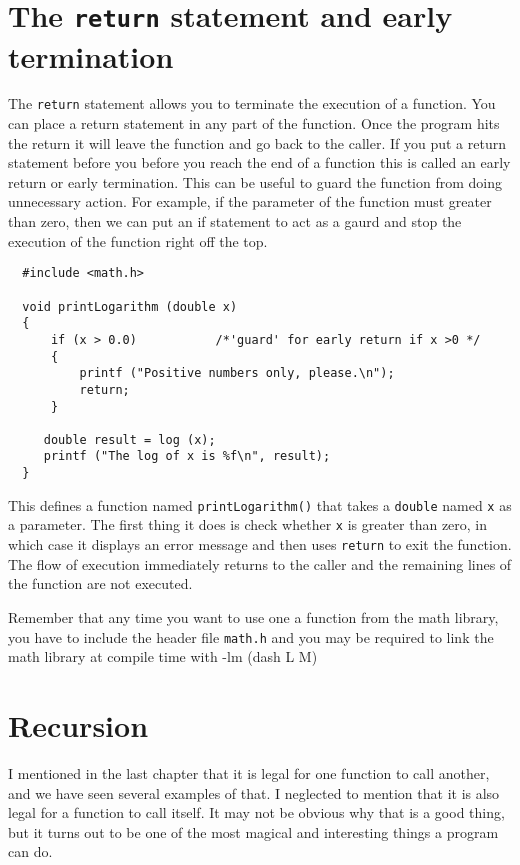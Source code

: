 \section{The {\tt return} statement and early termination}

The {\tt return} statement allows you to terminate the execution
of a function. You can place a return statement in any part of the function. Once the program hits the return it will leave the function and go back to the caller. 
If you put a return statement before you before you reach the end of a function this is called an early return or early termination. This can be useful to guard the function from doing unnecessary action. For example, if the parameter of the function must greater than zero, then we can put an if statement to act as a gaurd and stop the 
execution of the function right off the top.

\begin{verbatim}
  #include <math.h>

  void printLogarithm (double x) 
  {
      if (x > 0.0) 			 /*'guard' for early return if x >0 */
      {
          printf ("Positive numbers only, please.\n");
          return;  
      }

     double result = log (x);
     printf ("The log of x is %f\n", result);
  }
\end{verbatim}
%
This defines a function named {\tt printLogarithm()} that takes
a {\tt double} named {\tt x} as a parameter.  The first thing
it does is check whether {\tt x} is greater than
zero, in which case it displays an error message and then uses
{\tt return} to exit the function.  The flow of execution
immediately returns to the caller and the remaining lines of
the function are not executed.

Remember that any time you want to use one a function from the math
library, you have to include the header file {\tt math.h} and 
you may be required to link the math library at compile time with -lm (dash L M)

\section{Recursion}
\label{recursion}

I mentioned in the last chapter that it is legal for one function to
call another, and we have seen several examples of that.  I neglected
to mention that it is also legal for a function to call itself.  It
may not be obvious why that is a good thing, but it turns out to be
one of the most magical and interesting things a program can do.

